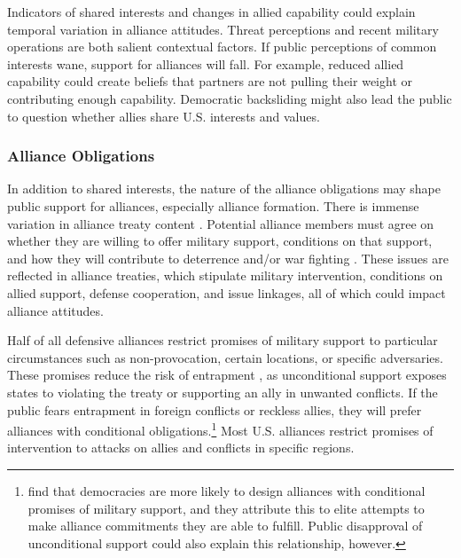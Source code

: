 \documentclass[12pt]{article}
\begin{document}
Indicators of shared interests and changes in allied capability could explain temporal variation in alliance attitudes. 
Threat perceptions and recent military operations are both salient contextual factors. 
If public perceptions of common interests wane, support for alliances will fall. 
For example, reduced allied capability could create beliefs that partners are not pulling their weight or contributing enough capability. 
Democratic backsliding might also lead the public to question whether allies share U.S. interests and values. 



\subsubsection*{Alliance Obligations}


In addition to shared interests, the nature of the alliance obligations may shape public support for alliances, especially alliance formation. 
There is immense variation in alliance treaty content \citep{Leedsetal2002}.
Potential alliance members must agree on whether they are willing to offer military support, conditions on that support, and how they will contribute to deterrence and/or war fighting \citep{Poast2019a}. 
These issues are reflected in alliance treaties, which stipulate military intervention, conditions on allied support, defense cooperation, and issue linkages, all of which could impact alliance attitudes. 


Half of all defensive alliances restrict promises of military support to particular circumstances such as non-provocation, certain locations, or specific adversaries. 
These promises reduce the risk of entrapment \citep{Benson2012}, as unconditional support exposes states to violating the treaty or supporting an ally in unwanted conflicts.
If the public fears entrapment in foreign conflicts or reckless allies, they will prefer alliances with conditional obligations.\footnote{\citep{Chibaetal2015} find that democracies are more likely to design alliances with conditional promises of military support, and they attribute this to elite attempts to make alliance commitments they are able to fulfill. Public disapproval of unconditional support could also explain this relationship, however.}
Most U.S. alliances restrict promises of intervention to attacks on allies and conflicts in specific regions. 
\end{document}
